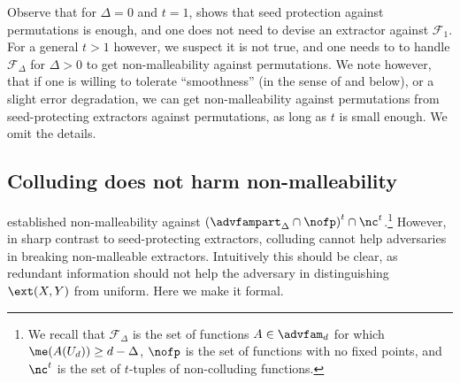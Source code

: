 Observe that for $\Delta = 0$ and $t = 1$,  shows that seed protection against
permutations is enough, and one does not need to devise an extractor against $\mathcal{F}_1$.
For a general $t > 1$ however, we suspect it is not true, and one needs to to handle $\mathcal{F}_\Delta$
for $\Delta > 0$ to get non-malleability against permutations. We note however, that if one is willing
to tolerate ``smoothness'' (in the sense of  and  below), or a slight
error degradation, we can get non-malleability against permutations from seed-protecting extractors
against permutations, as long as $t$ is small enough. We omit the details.

\subsection{Colluding does not harm non-malleability}\label{sec:no nc}

 established non-malleability against $\left(\advfampart_{\Delta} \cap \nofp\right)^t \cap \nc^t$.\footnote{We recall that $\mathcal{F}_{\Delta}$ is the set of functions $A \in \advfam_d$ for which $\me(A(U_d)) \ge d-\Delta$, $\nofp$ is the set of functions with no fixed points, and $\nc^t$ is
the set of $t$-tuples of non-colluding functions.}
However, in sharp contrast to seed-protecting extractors, colluding cannot help
adversaries in breaking non-malleable extractors. Intuitively this should be clear, as
redundant information should not help the adversary in distinguishing $\ext(X,Y)$
from uniform. Here we make it formal.

